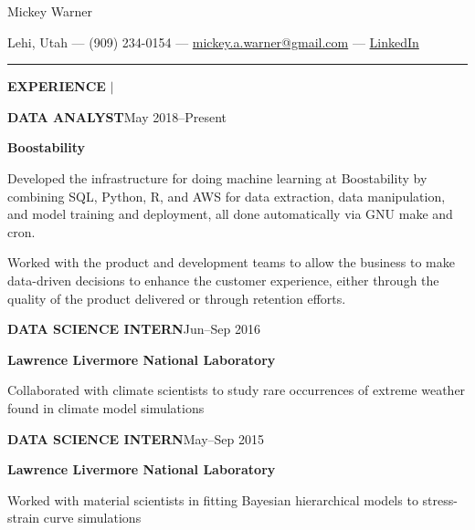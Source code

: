 \documentclass[12pt]{article}
\newcommand{\entrypar}[5]{
    \textbf{\MakeUppercase{#1}}\hfill #3--#4

    \textbf{#2}

    #5
    }
\begin{document}

\begin{center}
\begin{Huge}
Mickey Warner
\end{Huge}
\smallskip
\smallskip

Lehi, Utah --- (909) 234-0154 --- \href{mailto:mickey.a.warner@gmail.com}{mickey.a.warner@gmail.com} --- \href{https://www.linkedin.com/in/mickey-warner/}{LinkedIn}
\end{center}

\hrule

\bigskip

\begin{minipage}[t]{0.19\textwidth}
    \begin{flushright}
        \textbf{EXPERIENCE} $\vert$ \ \
    \end{flushright}
\end{minipage}%
%
\begin{minipage}[t]{0.81\textwidth}
    \begin{flushleft}
        \entrypar{Data analyst}{Boostability}{May 2018}{Present}{
Developed the infrastructure for doing machine learning at Boostability by combining SQL, Python, R, and AWS for data extraction, data manipulation, and model training and deployment, all done automatically via GNU make and cron.
\bigskip

Worked with the product and development teams to allow the business to make data-driven decisions to enhance the customer experience, either through the quality of the product delivered or through retention efforts.
        }

        \bigskip

        \entrypar{Data science intern}{Lawrence Livermore National Laboratory}{Jun}{Sep 2016}{
Collaborated with climate scientists to study rare occurrences of extreme weather found in climate model simulations
        }
        \bigskip

        \entrypar{Data science intern}{Lawrence Livermore National Laboratory}{May}{Sep 2015}{
Worked with material scientists in fitting Bayesian hierarchical models to stress-strain curve simulations
        }
    \end{flushleft}
\end{minipage}

\bigskip
\bigskip
\end{document}
